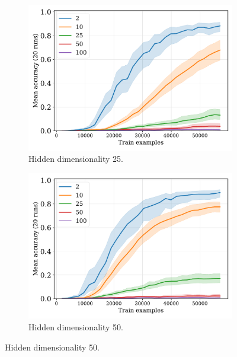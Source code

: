\begin{figure}[H]
  \begin{subfigure}{0.45\linewidth}
    \includegraphics[width=1\textwidth]{../fig/fuzzy-lm-vocab20-pretrain-3tasks-train_size-embed_dim-hidden_dim=25.pdf}
    \caption{Hidden dimensionality 25.}
  \end{subfigure}
  \hfill
  \begin{subfigure}{0.45\linewidth}
    \includegraphics[width=1\textwidth]{../fig/fuzzy-lm-vocab20-pretrain-3tasks-train_size-embed_dim-hidden_dim=50.pdf}
    \caption{Hidden dimensionality 50.}
  \end{subfigure}

  \vspace{24pt}


\end{figure}
